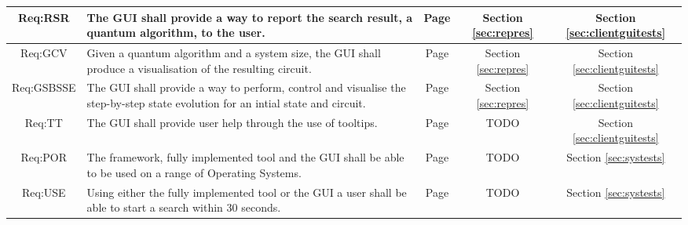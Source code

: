 \begin{landscape}
\begin{longtable}{|c|m{10cm}|c|c|m{4cm}|}
Req:RSR &
The GUI shall provide a way to report the search result, a quantum algorithm, to the user. &
Page \pageref{sec:reqrsr} &
Section \ref{sec:repres} &
\multicolumn{1}{c|}{Section \ref{sec:clientguitests}} \\ \hline

Req:GCV &
Given a quantum algorithm and a system size, the GUI shall produce a visualisation of the resulting circuit. &
Page \pageref{sec:reqgcv} &
Section \ref{sec:repres} &
\multicolumn{1}{c|}{Section \ref{sec:clientguitests}} \\ \hline

Req:GSBSSE &
The GUI shall provide a way to perform, control and visualise the step-by-step state evolution for an intial state and circuit. &
Page \pageref{sec:reqgsbsse} &
Section \ref{sec:repres} &
\multicolumn{1}{c|}{Section \ref{sec:clientguitests}} \\ \hline

Req:TT &
The GUI shall provide user help through the use of tooltips. &
Page \pageref{sec:reqtt} &
TODO &
\multicolumn{1}{c|}{Section \ref{sec:clientguitests}} \\ \hline

Req:POR &
The framework, fully implemented tool and the GUI shall be able to be used on a range of Operating Systems. &
Page \pageref{sec:reqpor} &
TODO &
\multicolumn{1}{c|}{Section \ref{sec:systests}} \\ \hline

Req:USE &
Using either the fully implemented tool or the GUI a user shall be able to start a search within 30 seconds. &
Page \pageref{sec:requse} &
TODO &
\multicolumn{1}{c|}{Section \ref{sec:systests}} \\ \hline

\end{longtable}
\end{landscape}
\clearpage
